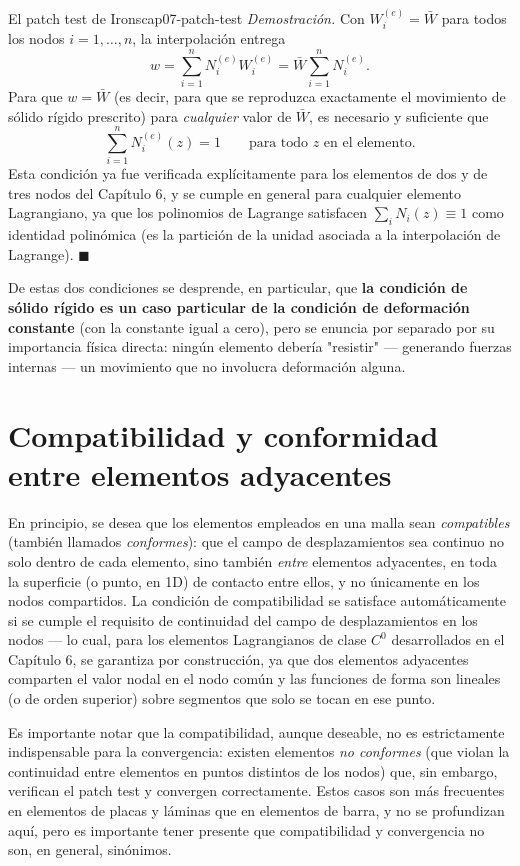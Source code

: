 \begin{teorema}{El patch test de Irons}{cap07-patch-test}
\emph{Demostración.} Con $W_i^{(e)}=\bar W$ para todos los nodos $i=1,\dots,n$, la interpolación entrega
\[
w = \sum_{i=1}^n N_i^{(e)} W_i^{(e)} = \bar W \sum_{i=1}^n N_i^{(e)} .
\]
Para que $w=\bar W$ (es decir, para que se reproduzca exactamente el movimiento de sólido rígido prescrito) para \emph{cualquier} valor de $\bar W$, es necesario y suficiente que
\[
\sum_{i=1}^n N_i^{(e)}(z) = 1 \qquad \text{para todo } z \text{ en el elemento.}
\]
Esta condición ya fue verificada explícitamente para los elementos de dos y de tres nodos del Capítulo 6, y se cumple en general para cualquier elemento Lagrangiano, ya que los polinomios de Lagrange satisfacen $\sum_i N_i(z) \equiv 1$ como identidad polinómica (es la partición de la unidad asociada a la interpolación de Lagrange). $\blacksquare$
\end{teorema}

De estas dos condiciones se desprende, en particular, que \textbf{la condición de sólido rígido es un caso particular de la condición de deformación constante} (con la constante igual a cero), pero se enuncia por separado por su importancia física directa: ningún elemento debería "resistir" --- generando fuerzas internas --- un movimiento que no involucra deformación alguna.

\section{Compatibilidad y conformidad entre elementos adyacentes}

En principio, se desea que los elementos empleados en una malla sean \emph{compatibles} (también llamados \emph{conformes}): que el campo de desplazamientos sea continuo no solo dentro de cada elemento, sino también \emph{entre} elementos adyacentes, en toda la superficie (o punto, en 1D) de contacto entre ellos, y no únicamente en los nodos compartidos. La condición de compatibilidad se satisface automáticamente si se cumple el requisito de continuidad del campo de desplazamientos en los nodos --- lo cual, para los elementos Lagrangianos de clase $C^0$ desarrollados en el Capítulo 6, se garantiza por construcción, ya que dos elementos adyacentes comparten el valor nodal en el nodo común y las funciones de forma son lineales (o de orden superior) sobre segmentos que solo se tocan en ese punto.

Es importante notar que la compatibilidad, aunque deseable, no es estrictamente indispensable para la convergencia: existen elementos \emph{no conformes} (que violan la continuidad entre elementos en puntos distintos de los nodos) que, sin embargo, verifican el patch test y convergen correctamente. Estos casos son más frecuentes en elementos de placas y láminas que en elementos de barra, y no se profundizan aquí, pero es importante tener presente que compatibilidad y convergencia no son, en general, sinónimos.

